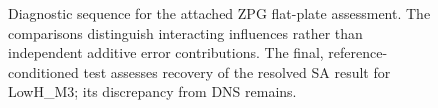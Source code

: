 \begin{figure}[H]
    \centering
    
    \caption[Diagnostic sequence for the wall-function error assessment]{Diagnostic sequence for the attached ZPG flat-plate assessment. The comparisons distinguish interacting influences rather than independent additive error contributions. The final, reference-conditioned test assesses recovery of the resolved SA result for LowH\_M3; its discrepancy from DNS remains.}
    \label{fig:wall_function_error_overview}
\end{figure}





